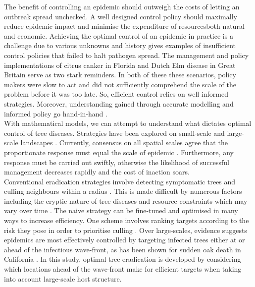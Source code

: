 The benefit of controlling an epidemic should outweigh the costs of letting an outbreak spread unchecked. A well designed control policy should maximally reduce epidemic impact and minimise the expenditure of resources\textemdash both natural and economic. Achieving the optimal control of an epidemic in practice is a challenge due to various unknowns \cite{13-challenges} and history gives examples of insufficient control policies that failed to halt pathogen spread. The management and policy implementations of citrus canker in Florida \cite{schubert2001meeting} and Dutch Elm disease in Great Britain \cite{dutch-elm-mismanage} serve as two stark reminders. In both of these these scenarios, policy makers were slow to act and did not sufficiently comprehend the scale of the problem before it was too late. So, efficient control relies on well informed strategies. Moreover, understanding gained through accurate modelling and informed policy go hand-in-hand \cite{jones2020modelling}.\\

With mathematical models, we can attempt to understand what dictates optimal control of tree diseases. Strategies have been explored on small-scale \cite{risk-potential-control, WEBIDEMICS} and large-scale landscapes \cite{large-scale-control, large-scale-control2}. Currently, consensus on all spatial scales agree that the proportionate response must equal the scale of epidemic \cite{control-scale-matching}. Furthermore, any response must be carried out swiftly, otherwise the likelihood of successful management decreases rapidly and the cost of inaction soars.\\

Conventional eradication strategies involve detecting symptomatic trees and culling neighbours within a radius \cite{WEBIDEMICS}. This is made difficult by numerous factors including the cryptic nature of tree diseases and resource constraints which may vary over time \cite{control-theory, control-theory-application}. The naive strategy can be fine-tuned and optimised in many ways to increase efficiency. One scheme involves ranking targets according to the risk they pose in order to prioritise culling \cite{risk-potential-control}. Over large-scales, evidence suggests epidemics are most effectively controlled by targeting infected trees either at or ahead of the infectious wave-front, as has been shown for sudden oak death in California \cite{large-scale-control}. In this study, optimal tree eradication is developed by considering which locations ahead of the wave-front make for efficient targets when taking into account large-scale host structure.

